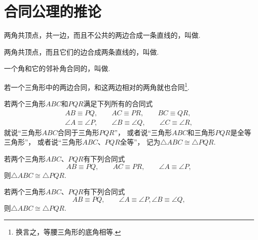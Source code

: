\section{合同公理的推论}
\begin{definition}
两角共顶点，共一边，而且不公共的两边合成一条直线的，叫做.
\end{definition}
\begin{definition}
两角共顶点，而且它们的边合成两条直线的，叫做.
\end{definition}
\begin{definition}
一个角和它的邻补角合同的，叫做.
\end{definition}

\begin{theorem}\label{theorem:欧氏几何.定理11}
若一个三角形中的两边合同，和这两边相对的两角就也合同\footnote{%
换言之，等腰三角形的底角相等.
}.
\end{theorem}

\begin{definition}
若两个三角形\(ABC\)和\(PQR\)满足下列所有的合同式
\begin{equation*}
\begin{split}
AB \equiv PQ, \qquad
AC \equiv PR, \qquad
BC \equiv QR, \\
\angle A \equiv \angle P, \qquad
\angle B \equiv \angle Q, \qquad
\angle C \equiv \angle R,
\end{split}
\end{equation*}
就说“三角形\(ABC\)合同于三角形\(PQR\)”，
或者说“三角形\(ABC\)和三角形\(PQR\)是全等三角形”，
或者说“三角形\(ABC\)、\(PQR\)全等”，
记为\(\triangle ABC \cong \triangle PQR\).
\end{definition}

\begin{theorem}[三角形的合同定理1]\label{theorem:欧氏几何.定理12}
若两个三角形\(ABC\)、\(PQR\)有下列合同式
\begin{equation*}
AB \equiv PQ, \qquad
AC \equiv PR, \qquad
\angle A \equiv \angle P,
\end{equation*}
则\(\triangle ABC \cong \triangle PQR\).
\end{theorem}

\begin{theorem}[三角形的合同定理2]\label{theorem:欧氏几何.定理13}
若两个三角形\(ABC\)、\(PQR\)有下列合同式
\begin{equation*}
AB \equiv PQ, \qquad
\angle A \equiv \angle P,
\angle B \equiv \angle Q,
\end{equation*}
则\(\triangle ABC \cong \triangle PQR\).
\end{theorem}

